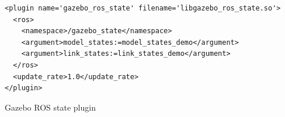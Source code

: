 \documentclass[12pt,oneside]{article}
\begin{document}
\begin{listing}[H]
\begin{tcolorbox}[]
\begin{verbatim} 
<plugin name='gazebo_ros_state' filename='libgazebo_ros_state.so'>
  <ros>
    <namespace>/gazebo_state</namespace>
    <argument>model_states:=model_states_demo</argument>
    <argument>link_states:=link_states_demo</argument>
  </ros>
  <update_rate>1.0</update_rate>
</plugin>
\end{verbatim}
\end{tcolorbox}
\caption{Gazebo ROS state plugin}
\label{gazeboRosStatePluginXml}
\end{listing}

%
\end{document}
